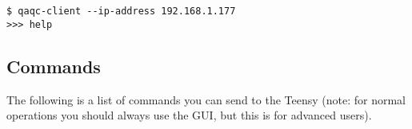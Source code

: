 \documentclass[12pt,openright,twoside]{report}
\begin{document}
\begin{mdframed}[backgroundcolor=light-gray, roundcorner=10pt,leftmargin=1, rightmargin=1, innerleftmargin=15, innertopmargin=15,innerbottommargin=15, outerlinewidth=1, linecolor=light-gray]
\begin{lstlisting}
$ qaqc-client --ip-address 192.168.1.177
>>> help
\end{lstlisting}
\end{mdframed}

\subsection{Commands}
The following is a list of commands you can send to the Teensy (note: for
normal operations you should always use the GUI, but this is for advanced
users).
\end{document}
